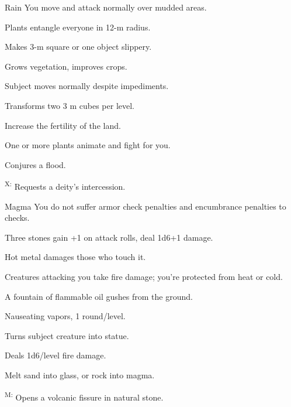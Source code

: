 {Rain}
{You move and attack normally over mudded areas.}
{
	\item {} Plants entangle everyone in 12-m radius.
	\item {} Makes 3-m square or one object slippery.
	\item {} Grows vegetation, improves crops.
	\item {} Subject moves normally despite impediments.
	\item {} Transforms two 3 m cubes per level.
	\item {} Increase the fertility of the land.
	\item {} One or more plants animate and fight for you.
	\item {} Conjures a flood.
	\item {}\textsuperscript{X:} Requests a deity's intercession.
}

{Magma}
{You do not suffer armor check penalties and encumbrance penalties to  checks.}
{
	\item {} Three stones gain +1 on attack rolls, deal 1d6+1 damage.
	\item {} Hot metal damages those who touch it.
	\item {} Creatures attacking you take fire damage; you're protected from heat or cold.
	\item {} A fountain of flammable oil gushes from the ground.
	\item {} Nauseating vapors, 1 round/level.
	\item {} Turns subject creature into statue.
	\item {} Deals 1d6/level fire damage.
	\item {} Melt sand into glass, or rock into magma.
	\item {}\textsuperscript{M:} Opens a volcanic fissure in natural stone.
}

